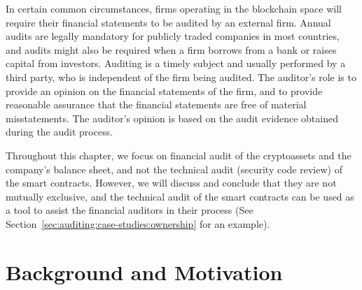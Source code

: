 In certain common circumstances, firms operating in the blockchain space will require their financial statements to be audited by an external firm. Annual audits are legally mandatory for publicly traded companies in most countries, and audits might also be required when a firm borrows from a bank or raises capital from investors. Auditing is a timely subject and usually performed by a third party, who is independent of the firm being audited. The auditor's role is to provide an opinion on the financial statements of the firm, and to provide reasonable assurance that the financial statements are free of material misstatements. The auditor's opinion is based on the audit evidence obtained during the audit process. 

Throughout this chapter, we focus on financial audit of the cryptoassets and the company's balance sheet, and not the technical audit (\eg security code review) of the smart contracts. However, we will discuss and conclude that they are not mutually exclusive, and the technical audit of the smart contracts can be used as a tool to assist the financial auditors in their process (See Section~\ref{sec:auditing:case-studies:ownership} for an example).








\section{Background and Motivation} \label{sec:auditing:background}

